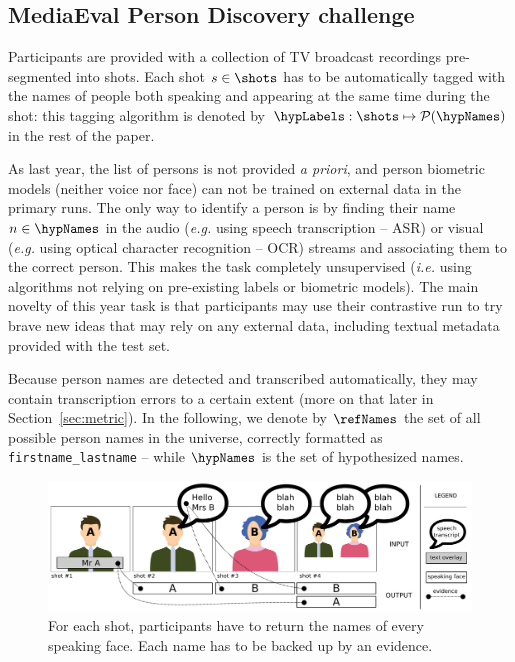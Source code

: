 \subsection{MediaEval Person Discovery challenge}

 Participants are provided with a collection of TV broadcast recordings pre-segmented into shots.
Each shot $s \in \shots$ has to be automatically tagged with the names of people both speaking and appearing at the same time during the shot: this tagging algorithm is denoted by $\hypLabels : \shots \mapsto \mathcal{P}(\hypNames)$ in the rest of the paper.

As last year, the list of persons is not provided \emph{a priori}, and person biometric models (neither voice nor face) can not be trained on external data in the primary runs. The only way to identify a person is by finding their name $n \in \hypNames$ in the audio (\emph{e.g.} using speech transcription -- ASR) or visual (\emph{e.g.} using optical character recognition -- OCR) streams and associating them to the correct person. This makes the task completely unsupervised (\emph{i.e.} using algorithms not relying on pre-existing labels or biometric models). The main novelty of this year task is that participants may use their contrastive run to try brave new ideas that may rely on any external data, including textual metadata provided with the test set.

Because person names are detected and transcribed automatically, they may contain transcription errors to a certain extent (more on that later in Section~\ref{sec:metric}). In the following, we denote by $\refNames$ the set of all possible person names in the universe, correctly formatted as \texttt{firstname\_lastname} -- while $\hypNames$ is the set of hypothesized names.

\begin{figure}[!htb]
 \centering
 \includegraphics[width=1.\linewidth]{evidence.pdf}

 \caption{For each shot, participants have to return the names of every speaking face. Each name has to be backed up by an evidence.}
 \label{fig:evidence}
\end{figure}

